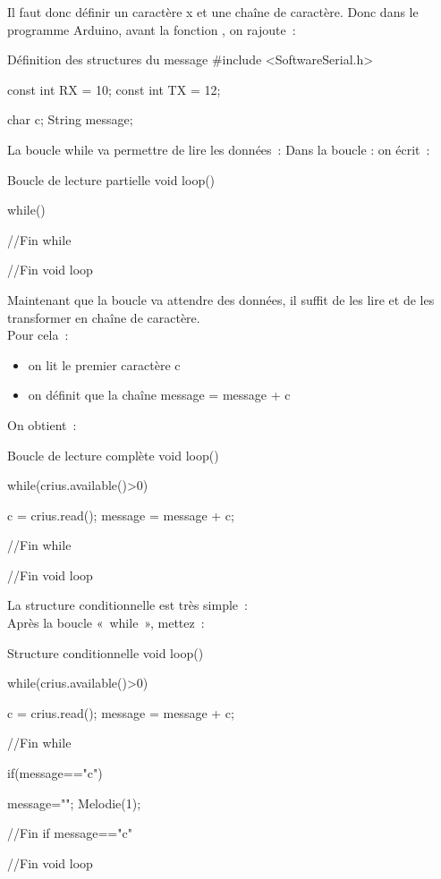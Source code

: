 Il faut donc définir un caractère x et une chaîne de caractère.
Donc dans le programme Arduino, avant la fonction , on rajoute :

\begin{Cpp}{Définition des structures du message}
#include <SoftwareSerial.h>

const int RX = 10;
const int TX = 12;

char c;
String message;

\end{Cpp}

La boucle while va permettre de lire les données : 
Dans la boucle  : on écrit :

\begin{Cpp}{Boucle de lecture partielle}
 void loop() {
 
    while() {
    
    }//Fin while

 }//Fin void loop

\end{Cpp}

Maintenant que la boucle va attendre des données, il suffit de les lire et de les transformer en chaîne de caractère. \\
Pour cela : \\

\begin{itemize}
    \item on lit le premier caractère c
    \item on définit que la chaîne message = message + c 
\end{itemize}
On obtient :

\begin{Cpp}{Boucle de lecture complète}
 void loop() {
 
    while(crius.available()>0) {
    
        c = crius.read();
        message = message + c;
    }//Fin while

 }//Fin void loop

\end{Cpp}

La structure conditionnelle est très simple : \\
Après la boucle « while », mettez : \\

\begin{Cpp}{Structure conditionnelle}
 void loop() {
 
    while(crius.available()>0) {
    
        c = crius.read();
        message = message + c;
    }//Fin while
    
    if(message=="c") {
    
        message="";
        Melodie(1);
    }//Fin if message=="c"

 }//Fin void loop

\end{Cpp}

